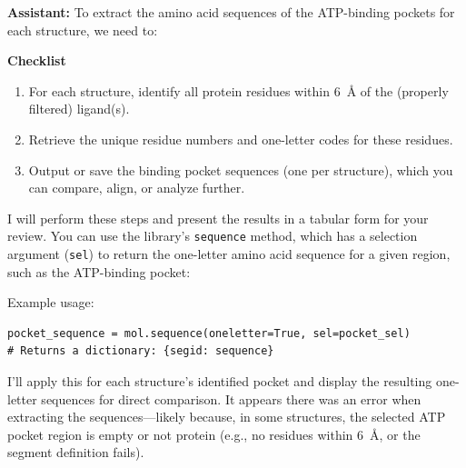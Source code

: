 \documentclass{article}
\begin{document}
\begin{assistantbox}
\textbf{Assistant:} To extract the amino acid sequences of the ATP-binding pockets for each structure, we need to:

\textbf{Checklist}
\begin{enumerate}[label=\arabic*.]
    \item For each structure, identify all protein residues within 6~\AA{} of the (properly filtered) ligand(s).
    \item Retrieve the unique residue numbers and one-letter codes for these residues.
    \item Output or save the binding pocket sequences (one per structure), which you can compare, align, or analyze further.
\end{enumerate}

I will perform these steps and present the results in a tabular form for your review. You can use the library's \texttt{sequence} method, which has a selection argument (\texttt{sel}) to return the one-letter amino acid sequence for a given region, such as the ATP-binding pocket:

Example usage:
\begin{verbatim}
pocket_sequence = mol.sequence(oneletter=True, sel=pocket_sel)
# Returns a dictionary: {segid: sequence}
\end{verbatim}

I’ll apply this for each structure’s identified pocket and display the resulting one-letter sequences for direct comparison. It appears there was an error when extracting the sequences—likely because, in some structures, the selected ATP pocket region is empty or not protein (e.g., no residues within 6~\AA{}, or the segment definition fails).


\end{assistantbox}
\end{document}
